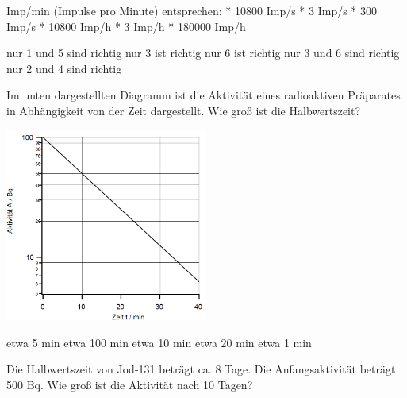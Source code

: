 \documentclass[11pt]{exam}
\begin{document}
\setlength{\voffset}{-0.5in}
\setlength{\headsep}{5pt}

\hspace{2mm}
 \hspace{5mm}
\vspace{4mm}

\begin{questions}

 Imp/min (Impulse pro Minute) entsprechen:	* 10800 Imp/s	* 3 Imp/s	* 300 Imp/s	* 10800 Imp/h	* 3 Imp/h	* 180000 Imp/h

\begin{choices}
	\choice nur 1 und 5 sind richtig
	\choice nur 3 ist richtig
	\choice nur 6 ist richtig
	\choice nur 3 und 6 sind richtig
	\choice nur 2 und 4 sind richtig
\end{choices}

\vspace{3mm}\question Im unten dargestellten Diagramm ist die Aktivität eines radioaktiven Präparates in Abhängigkeit von der Zeit dargestellt. Wie groß ist die Halbwertszeit? 

\includegraphics[width=0.5\textwidth]{../../../questions/K/images/zerfallsgesetz.png}

\begin{choices}
	\choice etwa 5 min
	\choice etwa 100 min
	\choice etwa 10 min
	\choice etwa 20 min
	\choice etwa 1 min
\end{choices}

\vspace{3mm}\question Die Halbwertszeit von Jod-131 beträgt ca. 8 Tage. Die Anfangsaktivität beträgt 500 Bq. Wie groß ist die Aktivität nach 10 Tagen?


\end{questions}
\end{document}
